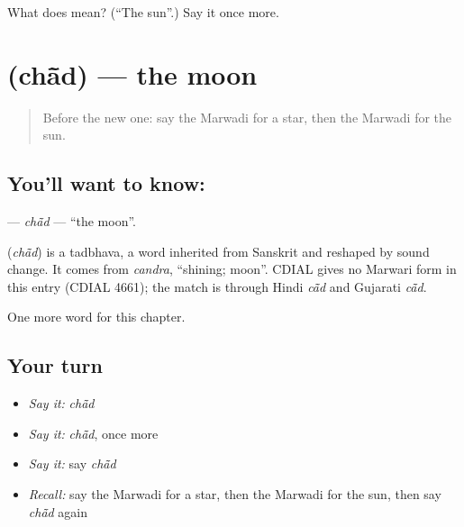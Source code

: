 \begin{tcolorbox}[breakable,colback=teal!4,colframe=teal!35!black,title={Before you move on}]
What does  mean? (\textquotedblleft{}The sun\textquotedblright{}.) Say it once more.
\end{tcolorbox}
\section[\texorpdfstring{\mw{चांद} (chā̃d)}{चांद (chā̃d)}]{ (chā̃d) — the moon}

\label{lesson:MW-C69-chad}



\begin{quote}
Before the new one: say the Marwadi for a star, then the Marwadi for the sun.
\end{quote}

\subsection*{You'll want to know: }
\textbf{} — \emph{chā̃d} — \textquotedblleft{}the moon\textquotedblright{}.

\begin{cousinweb}
\textbf{} (\emph{chā̃d}) is a tadbhava, a word inherited from Sanskrit and reshaped by sound change. It comes from \emph{candra}, \textquotedblleft{}shining; moon\textquotedblright{}. CDIAL gives no Marwari form in this entry (CDIAL 4661); the match is through Hindi \emph{cā̃d} and Gujarati \emph{cā̃d}.
\end{cousinweb}

\begin{grammarlens}[title={What you've built}]
One more word for this chapter.
\end{grammarlens}

\subsection*{Your turn}
\begin{itemize}
\raggedright
  \item \emph{Say it:} \emph{chā̃d}
  \item \emph{Say it:} \emph{chā̃d}, once more
  \item \emph{Say it:} say \emph{chā̃d}
  \item \emph{Recall:} say the Marwadi for a star, then the Marwadi for the sun, then say \emph{chā̃d} again
\end{itemize}


